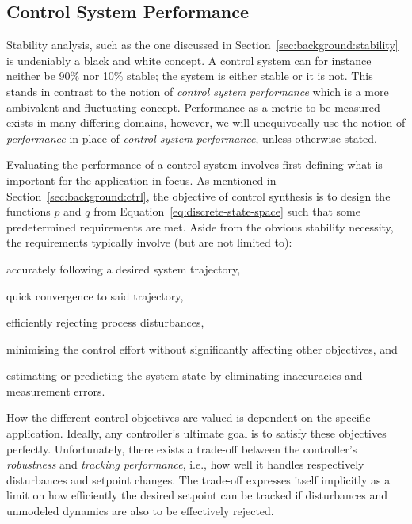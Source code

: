 \subsection{Control System Performance}%
\label{sec:background:performance}%
%
Stability analysis, such as the one discussed in Section~\ref{sec:background:stability} is undeniably a black and white concept.
A control system can for instance neither be 90\% nor 10\% stable; the system is either stable or it is not.
This stands in contrast to the notion of \emph{control system performance} which is a more ambivalent and fluctuating concept.
Performance as a metric to be measured exists in many differing domains, however, we will unequivocally use the notion of \emph{performance} in place of \emph{control system performance}, unless otherwise stated.

Evaluating the performance of a control system involves first defining what is important for the application in focus.
As mentioned in Section~\ref{sec:background:ctrl}, the objective of control synthesis is to design the functions $p$ and $q$ from Equation~\eqref{eq:discrete-state-space} such that some predetermined requirements are met.
Aside from the obvious stability necessity, the requirements typically involve (but are not limited to):
%
\begin{enumerate*}[label=(\roman*)]
    \item accurately following a desired system trajectory,
    \item quick convergence to said trajectory,
    \item efficiently rejecting process disturbances,
    \item minimising the control effort without significantly affecting other objectives, and
    \item estimating or predicting the system state by eliminating inaccuracies and measurement errors.
\end{enumerate*}
%
How the different control objectives are valued is dependent on the specific application.
Ideally, any controller's ultimate goal is to satisfy these objectives perfectly.
Unfortunately, there exists a trade-off between the controller's \emph{robustness} and \emph{tracking performance}, i.e., how well it handles respectively disturbances and setpoint changes.
The trade-off expresses itself implicitly as a limit on how efficiently the desired setpoint can be tracked if disturbances and unmodeled dynamics are also to be effectively rejected.

